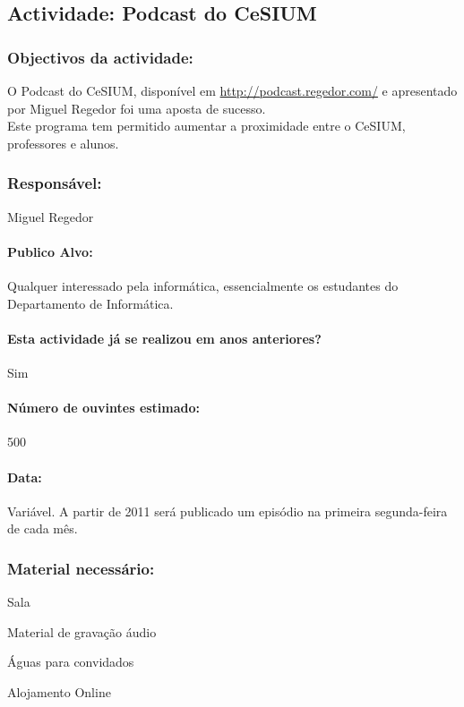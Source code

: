 \subsection{Actividade: Podcast do CeSIUM} 

\subsubsection*{Objectivos da actividade:}
\indent O Podcast do CeSIUM, disponível em \url{http://podcast.regedor.com/} e apresentado por Miguel Regedor foi uma aposta de sucesso.\\
\indent Este programa tem permitido aumentar a proximidade entre o CeSIUM, professores e alunos.\\
\subsubsection*{Responsável:}
\begin{itemizedash}
	\item{Miguel Regedor}
\end{itemizedash}

\paragraph{Publico Alvo: }
Qualquer interessado pela informática, essencialmente os estudantes do Departamento de Informática. 

\paragraph{Esta actividade já se realizou em anos anteriores?}
Sim

\paragraph{Número de ouvintes estimado:}
500

\paragraph{Data:} Variável. A partir de 2011 será publicado um episódio na primeira segunda-feira de cada mês.

\subsubsection*{Material necessário:}
\begin{itemizedash}
  \item{Sala}
  \item{Material de gravação áudio}
  \item{Águas para convidados}
  \item{Alojamento Online}
\end{itemizedash}

\vspace{20pt}

